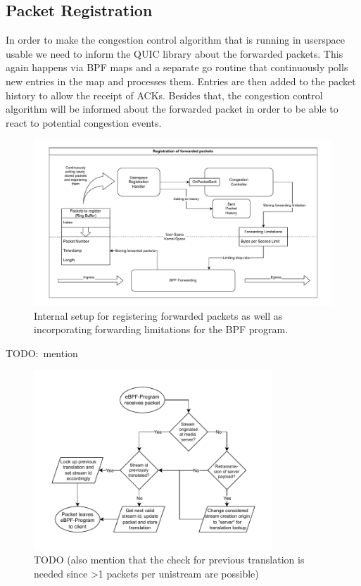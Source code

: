 \subsection{Packet Registration}
In order to make the congestion control algorithm that is running in userspace
usable we need to inform the QUIC library about the forwarded packets.
This again happens via BPF maps and a separate go routine that continuously
polls new entries in the map and processes them.
Entries are then added to the packet history to allow the receipt of ACKs.
Besides that, the congestion control algorithm will be informed about the
forwarded packet in order to be able to react to potential congestion events.
\begin{figure}[htbp]
    \centering
    \includegraphics[width=\textwidth]{figures/03_fast_relays/forward-registration.drawio.pdf}
    \caption[Packet registration schematic]{Internal setup for registering forwarded packets as well as incorporating forwarding
    limitations for the BPF program.}\label{fig:forward-registration}
\end{figure}



TODO:~mention
\begin{figure}[htbp]
    \centering
    \includegraphics[width=0.8\textwidth]{figures/03_fast_relays/stream-id-translation.drawio.pdf}
    \caption[Stream id translation schematic]{TODO (also mention that the check for previous translation is needed since >1 packets per unistream are possible)}\label{fig:stream-id-translation}
\end{figure}